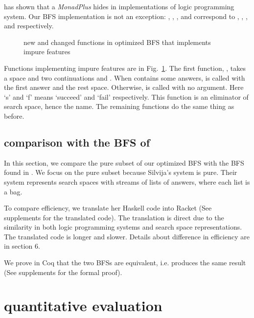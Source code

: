 \documentclass[format=acmlarge, review=true, authordraft=true]{acmart}
\begin{document}
\citet{kiselyov2005backtracking} has shown that a \emph{MonadPlus} hides in 
implementations of logic programming system. Our BFS implementation is not an 
exception: , , , and 
 correspond to , , , 
and  respectively.

\begin{figure}
	\caption{new and changed functions in optimized BFS that implements impure 
		features}
	\label{BFS-opt-cont}
\end{figure}

Functions implementing impure features are in Fig.~\ref{BFS-opt-cont}. The 
first function, , takes a space  and two 
continuations  and . When  contains some 
answers,  is called with the first answer and the rest space. 
Otherwise,  is called with no argument. Here `s' and `f' means 
`succeed' and `fail' respectively. This function is an eliminator of search 
space, hence the name. The remaining functions do the same thing as before.

\subsection{comparison with the BFS of \citet{seres1999algebra}}

In this section, we compare the pure subset of our optimized BFS with the BFS 
found in \citet{seres1999algebra}. We focus on the pure subset because 
Silvija's system is pure. Their system represents search spaces with streams of 
lists of answers, where each list is a bag.

To compare efficiency, we translate her Haskell code into Racket (See 
supplements for the translated code). The translation is direct 
due to the similarity in both logic programming systems and search space 
representations. The translated code is longer and slower. Details about 
difference in efficiency are in section 6.

We prove in Coq that the two BFSs are equivalent, i.e.  
produces the same result (See supplements for the formal proof).

\section{quantitative evaluation}
\end{document}
